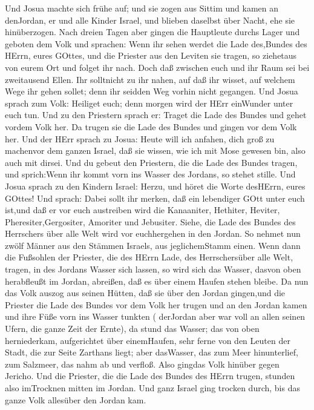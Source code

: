  Und Josua machte sich frühe auf; und sie zogen aus Sittim
und kamen an denJordan, er und alle Kinder Israel, und blieben daselbst
über Nacht, ehe sie hinüberzogen.  Nach dreien Tagen aber
gingen die Hauptleute durchs Lager  und geboten dem Volk und
sprachen: Wenn ihr sehen werdet die Lade des,Bundes des HErrn, eures
GOttes, und die Priester aus den Leviten sie tragen, so ziehetaus von
eurem Ort und folget ihr nach.  Doch daß zwischen euch und
ihr Raum sei bei zweitausend Ellen. Ihr solltnicht zu ihr nahen, auf daß
ihr wisset, auf welchem Wege ihr gehen sollet; denn ihr seidden Weg
vorhin nicht gegangen.  Und Josua sprach zum Volk: Heiliget
euch; denn morgen wird der HErr einWunder unter euch tun. 
Und zu den Priestern sprach er: Traget die Lade des Bundes und gehet
vordem Volk her. Da trugen sie die Lade des Bundes und gingen vor dem
Volk her.  Und der HErr sprach zu Josua: Heute will ich
anfahen, dich groß zu machenvor dem ganzen Israel, daß sie wissen, wie
ich mit Mose gewesen bin, also auch mit dirsei.  Und du
gebeut den Priestern, die die Lade des Bundes tragen, und sprich:Wenn
ihr kommt vorn ins Wasser des Jordans, so stehet stille. 
Und Josua sprach zu den Kindern Israel: Herzu, und höret die Worte
desHErrn, eures GOttes!  Und sprach: Dabei sollt ihr
merken, daß ein lebendiger GOtt unter euch ist,und daß er vor euch
austreiben wird die Kanaaniter, Hethiter, Heviter,
Pheresiter,Gergositer, Amoriter und Jebusiter.  Siehe, die
Lade des Bundes des Herrschers über alle Welt wird vor euchhergehen in
den Jordan.  So nehmet nun zwölf Männer aus den Stämmen
Israels, aus jeglichemStamm einen.  Wenn dann die Fußsohlen
der Priester, die des HErrn Lade, des Herrschersüber alle Welt, tragen,
in des Jordans Wasser sich lassen, so wird sich das Wasser, dasvon oben
herabfleußt im Jordan, abreißen, daß es über einem Haufen stehen bleibe.
 Da nun das Volk auszog aus seinen Hütten, daß sie über den
Jordan gingen,und die Priester die Lade des Bundes vor dem Volk her
trugen  und an den Jordan kamen und ihre Füße vorn ins
Wasser tunkten ( derJordan aber war voll an allen seinen Ufern, die
ganze Zeit der Ernte),  da stund das Wasser; das von oben
herniederkam, aufgerichtet über einemHaufen, sehr ferne von den Leuten
der Stadt, die zur Seite Zarthans liegt; aber dasWasser, das zum Meer
hinunterlief, zum Salzmeer, das nahm ab und verfloß. Also gingdas Volk
hinüber gegen Jericho.  Und die Priester, die die Lade des
Bundes des HErrn trugen, stunden also imTrocknen mitten im Jordan. Und
ganz Israel ging trocken durch, bis das ganze Volk allesüber den Jordan
kam.

